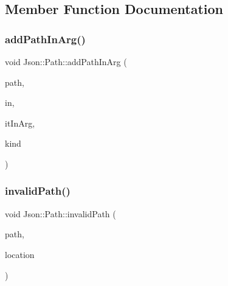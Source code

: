 \subsection{Member Function Documentation}
\mbox{\label{classJson_1_1Path_ae65717a5fbc35b1336cbf783b15aad2e_ae65717a5fbc35b1336cbf783b15aad2e}} 
\subsubsection{\texorpdfstring{add\+Path\+In\+Arg()}{addPathInArg()}}
{\footnotesize\ttfamily void Json\+::\+Path\+::add\+Path\+In\+Arg (\begin{DoxyParamCaption}\item[{const \hyperlink{json_8h_a1e723f95759de062585bc4a8fd3fa4be_a1e723f95759de062585bc4a8fd3fa4be}{J\+S\+O\+N\+C\+P\+P\+\_\+\+S\+T\+R\+I\+NG} \&}]{path,  }\item[{const \hyperlink{classJson_1_1Path_ab29d7b2fc896c7d3c5ed4609af3a3f23_ab29d7b2fc896c7d3c5ed4609af3a3f23}{In\+Args} \&}]{in,  }\item[{In\+Args\+::const\+\_\+iterator \&}]{it\+In\+Arg,  }\item[{\hyperlink{classJson_1_1PathArgument_a2420bbad778573c147e578701b84d9b9_a2420bbad778573c147e578701b84d9b9}{Path\+Argument\+::\+Kind}}]{kind }\end{DoxyParamCaption})\hspace{0.3cm}{\ttfamily [private]}}

\mbox{\label{classJson_1_1Path_a0fa77fc0cefefcfcf2f1242c79009dd9_a0fa77fc0cefefcfcf2f1242c79009dd9}} 
\subsubsection{\texorpdfstring{invalid\+Path()}{invalidPath()}}
{\footnotesize\ttfamily void Json\+::\+Path\+::invalid\+Path (\begin{DoxyParamCaption}\item[{const \hyperlink{json_8h_a1e723f95759de062585bc4a8fd3fa4be_a1e723f95759de062585bc4a8fd3fa4be}{J\+S\+O\+N\+C\+P\+P\+\_\+\+S\+T\+R\+I\+NG} \&}]{path,  }\item[{int}]{location }\end{DoxyParamCaption})\hspace{0.3cm}{\ttfamily [private]}}

